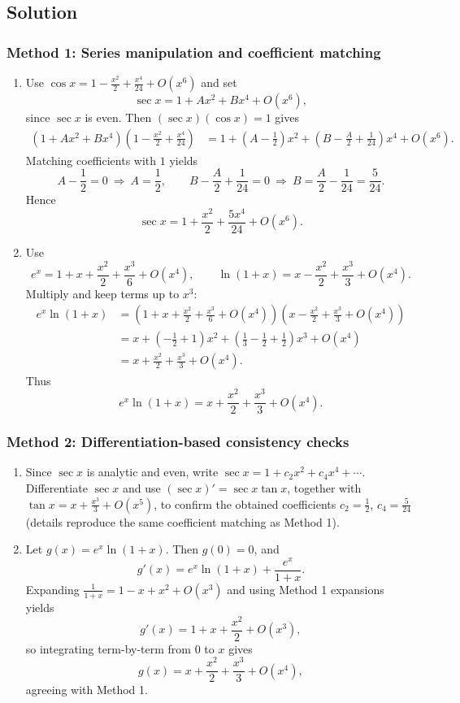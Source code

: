 \documentclass[12pt]{article}
\begin{document}
\subsection*{Solution}

\subsubsection*{Method 1: Series manipulation and coefficient matching}
\begin{enumerate}[label=(\alph*)]
\item Use \(\cos x=1-\frac{x^2}{2}+\frac{x^4}{24}+O(x^6)\) and set
\[
\sec x = 1 + A x^2 + B x^4 + O(x^6),
\]
since \(\sec x\) is even. Then \((\sec x)(\cos x)=1\) gives
\begin{align*}
(1+Ax^2+Bx^4)(1-\tfrac{x^2}{2}+\tfrac{x^4}{24}) &= 1 + \left(A-\tfrac12\right)x^2 + \left(B-\tfrac{A}{2}+\tfrac{1}{24}\right)x^4 + O(x^6).
\end{align*}
Matching coefficients with \(1\) yields
\[
A-\frac12=0\ \Rightarrow\ A=\frac12,
\qquad
B-\frac{A}{2}+\frac{1}{24}=0\ \Rightarrow\ B=\frac{A}{2}-\frac{1}{24}=\frac{5}{24}.
\]
Hence
\[
\boxed{\sec x = 1+\frac{x^2}{2}+\frac{5x^4}{24}+O(x^6).}
\]

\item Use
\[
e^x = 1+x+\frac{x^2}{2}+\frac{x^3}{6}+O(x^4),
\qquad
\ln(1+x)=x-\frac{x^2}{2}+\frac{x^3}{3}+O(x^4).
\]
Multiply and keep terms up to \(x^3\):
\begin{align*}
e^x\ln(1+x)
&=\left(1+x+\frac{x^2}{2}+\frac{x^3}{6}+O(x^4)\right)\left(x-\frac{x^2}{2}+\frac{x^3}{3}+O(x^4)\right)\\
&=x+\left(-\frac12+1\right)x^2+\left(\frac13-\frac12+\frac12\right)x^3+O(x^4)\\
&=x+\frac{x^2}{2}+\frac{x^3}{3}+O(x^4).
\end{align*}
Thus
\[
\boxed{e^x\ln(1+x)=x+\frac{x^2}{2}+\frac{x^3}{3}+O(x^4).}
\]
\end{enumerate}

\subsubsection*{Method 2: Differentiation-based consistency checks}
\begin{enumerate}[label=(\alph*)]
\item Since \(\sec x\) is analytic and even, write \(\sec x = 1+c_2x^2+c_4x^4+\cdots\).
Differentiate \(\sec x\) and use \((\sec x)'=\sec x\tan x\), together with \(\tan x = x+\frac{x^3}{3}+O(x^5)\), to confirm the obtained coefficients \(c_2=\frac12\), \(c_4=\frac{5}{24}\) (details reproduce the same coefficient matching as Method 1).

\item Let \(g(x)=e^x\ln(1+x)\). Then \(g(0)=0\), and
\[
g'(x)=e^x\ln(1+x)+\frac{e^x}{1+x}.
\]
Expanding \(\frac{1}{1+x}=1-x+x^2+O(x^3)\) and using Method 1 expansions yields
\[
g'(x)=1+x+\frac{x^2}{2}+O(x^3),
\]
so integrating term-by-term from \(0\) to \(x\) gives
\[
g(x)=x+\frac{x^2}{2}+\frac{x^3}{3}+O(x^4),
\]
agreeing with Method 1.
\end{enumerate}
\end{document}
